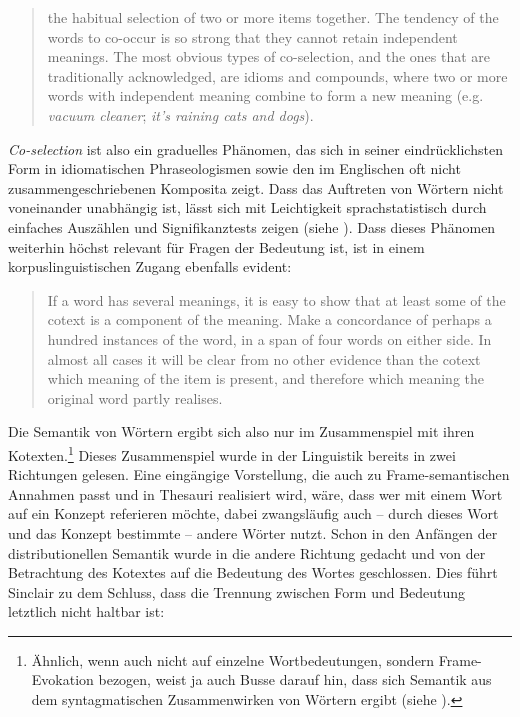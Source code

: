 \begin{quote}
the habitual selection of two or more items together. The tendency of the words to co-occur is so strong that they cannot retain independent meanings. The most obvious types of co-selection, and the ones that are traditionally acknowledged, are idioms and compounds, where two or more words with independent meaning combine to form a new meaning (e.g. \emph{vacuum cleaner}; \emph{it's raining cats and dogs}). \autocite[101]{tognini-bonelliCorpusLinguisticsWork2001}
\end{quote}

\emph{Co-selection} ist also ein graduelles Phänomen, das sich in seiner eindrücklichsten Form in idiomatischen Phraseologismen sowie den im Englischen oft nicht zusammengeschriebenen Komposita zeigt. Dass das Auftreten von Wörtern nicht voneinander unabhängig ist, lässt sich mit Leichtigkeit sprachstatistisch durch einfaches Auszählen und Signifikanztests zeigen (siehe ). Dass dieses Phänomen weiterhin höchst relevant für Fragen der Bedeutung ist, ist in einem korpuslinguistischen Zugang ebenfalls evident:

\begin{quote}
If a word has several meanings, it is easy to show that at least some of the cotext is a component of the meaning. Make a concordance of perhaps a hundred instances of the word, in a span of four words on either side. In almost all cases it will be clear from no other evidence than the cotext which meaning of the item is present, and therefore which meaning the original word partly realises. \autocites[20]{sinclairMeaningFrameworkCorpus2005}{sinclairSECTION1MULTILINGUAL1996}
\end{quote}

Die Semantik von Wörtern ergibt sich also nur im Zusammenspiel mit ihren Kotexten.\footnote{Ähnlich, wenn auch nicht auf einzelne Wortbedeutungen, sondern Frame-Evokation bezogen, weist ja auch Busse darauf hin, dass sich Semantik aus dem syntagmatischen Zusammenwirken von Wörtern ergibt (siehe ).} Dieses Zusammenspiel wurde in der Linguistik bereits in zwei Richtungen gelesen. Eine eingängige Vorstellung, die auch zu Frame-semantischen Annahmen passt und in Thesauri realisiert wird, wäre, dass wer mit einem Wort auf ein Konzept referieren möchte, dabei zwangsläufig auch -- durch dieses Wort und das Konzept bestimmte -- andere Wörter nutzt. Schon in den Anfängen der distributionellen Semantik wurde in die andere Richtung gedacht und von der Betrachtung des Kotextes auf die Bedeutung des Wortes geschlossen. Dies führt Sinclair zu dem Schluss, dass die Trennung zwischen Form und Bedeutung letztlich nicht haltbar ist:

